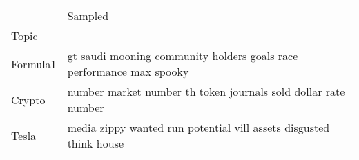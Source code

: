 \begin{tabular}{ll}
\toprule
{} &                                                               Sampled \\
Topic    &                                                                       \\
\midrule
Formula1 &  gt saudi mooning community holders goals race performance max spooky \\
Crypto   &        number market number th token journals sold dollar rate number \\
Tesla    &    media zippy wanted run potential vill assets disgusted think house \\
\bottomrule
\end{tabular}
